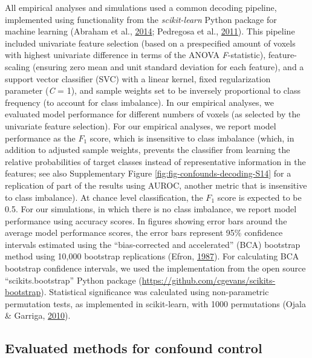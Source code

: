 \documentclass[11pt,american,a4paper,oneside,]{memoir} %
\begin{document}
All empirical analyses and simulations used a common decoding pipeline, implemented using functionality from the \emph{scikit-learn} Python package for machine learning (Abraham et al., \protect\hyperlink{ref-Abraham2014-ef}{2014}; Pedregosa et al., \protect\hyperlink{ref-pedregosa2011scikit}{2011}). This pipeline included univariate feature selection (based on a prespecified amount of voxels with highest univariate difference in terms of the ANOVA \emph{F}-statistic), feature-scaling (ensuring zero mean and unit standard deviation for each feature), and a support vector classifier (SVC) with a linear kernel, fixed regularization parameter (\emph{C} = 1), and sample weights set to be inversely proportional to class frequency (to account for class imbalance). In our empirical analyses, we evaluated model performance for different numbers of voxels (as selected by the univariate feature selection). For our empirical analyses, we report model performance as the \(F_{1}\) score, which is insensitive to class imbalance (which, in addition to adjusted sample weights, prevents the classifier from learning the relative probabilities of target classes instead of representative information in the features; see also Supplementary Figure \ref{fig:fig-confounds-decoding-S14} for a replication of part of the results using AUROC, another metric that is insensitive to class imbalance). At chance level classification, the \(F_{1}\) score is expected to be 0.5. For our simulations, in which there is no class imbalance, we report model performance using accuracy scores. In figures showing error bars around the average model performance scores, the error bars represent 95\% confidence intervals estimated using the ``bias-corrected and accelerated'' (BCA) bootstrap method using 10,000 bootstrap replications (Efron, \protect\hyperlink{ref-efron1987better}{1987}). For calculating BCA bootstrap confidence intervals, we used the implementation from the open source ``scikits.bootstrap'' Python package (\url{https://github.com/cgevans/scikits-bootstrap}). Statistical significance was calculated using non-parametric permutation tests, as implemented in scikit-learn, with 1000 permutations (Ojala \& Garriga, \protect\hyperlink{ref-Ojala2010-rc}{2010}).

\hypertarget{confounds-decoding-methods-evaluated-methods}{%
\subsection{Evaluated methods for confound control}\label{confounds-decoding-methods-evaluated-methods}}
\end{document}
